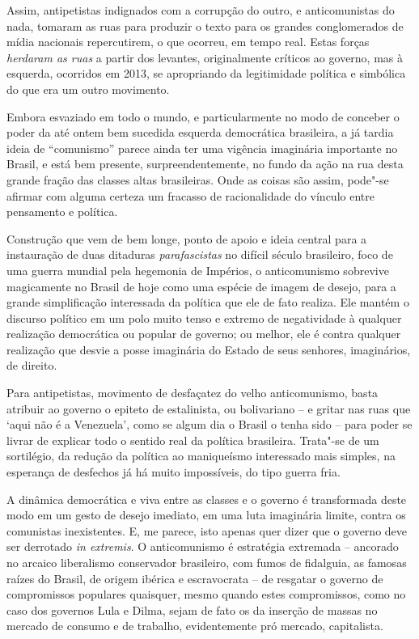 Assim, antipetistas indignados com a corrupção do outro, e
anticomunistas do nada, tomaram as ruas para produzir o texto para os
grandes conglomerados de mídia nacionais repercutirem, o que ocorreu, em
tempo real. Estas forças \emph{herdaram as ruas} a partir dos levantes,
originalmente críticos ao governo, mas à esquerda, ocorridos em 2013, se
apropriando da legitimidade política e simbólica do que era um outro
movimento.

Embora esvaziado em todo o mundo, e particularmente no modo de conceber
o poder da até ontem bem sucedida esquerda democrática brasileira, a já
tardia ideia de ``comunismo'' parece ainda ter uma vigência imaginária
importante no Brasil, e está bem presente, surpreendentemente, no fundo
da ação na rua desta grande fração das classes altas brasileiras. Onde
as coisas são assim, pode"-se afirmar com alguma certeza um fracasso de
racionalidade do vínculo entre pensamento e política.

Construção que vem de bem longe, ponto de apoio e ideia central para a
instauração de duas ditaduras \emph{parafascistas} no difícil século 
brasileiro, foco de uma guerra mundial pela hegemonia de Impérios, o
anticomunismo sobrevive magicamente no Brasil de hoje como uma espécie
de imagem de desejo, para a grande simplificação interessada da política
que ele de fato realiza. Ele mantém o discurso político em um polo muito
tenso e extremo de negatividade à qualquer realização democrática ou
popular de governo; ou melhor, ele é contra qualquer realização que
desvie a posse imaginária do Estado de seus senhores, imaginários, de
direito.

Para antipetistas, movimento de desfaçatez do velho anticomunismo, basta
atribuir ao governo o epiteto de estalinista, ou bolivariano -- e gritar
nas ruas que `aqui não é a Venezuela', como se algum dia o Brasil o
tenha sido -- para poder se livrar de explicar todo o sentido real da
política brasileira. Trata"-se de um sortilégio, da redução da política
ao maniqueísmo interessado mais simples, na esperança de desfechos já há
muito impossíveis, do tipo guerra fria.

A dinâmica democrática e viva entre as classes e o governo é
transformada deste modo em um gesto de desejo imediato, em uma luta
imaginária limite, contra os comunistas inexistentes. E, me parece, isto
apenas quer dizer que o governo deve ser derrotado \emph{in extremis}. O
anticomunismo é estratégia extremada -- ancorado no arcaico liberalismo
conservador brasileiro, com fumos de fidalguia, as famosas raízes do
Brasil, de origem ibérica e escravocrata -- de resgatar o governo de
compromissos populares quaisquer, mesmo quando estes compromissos, como
no caso dos governos Lula e Dilma, sejam de fato os da inserção de
massas no mercado de consumo e de trabalho, evidentemente pró mercado,
capitalista.


